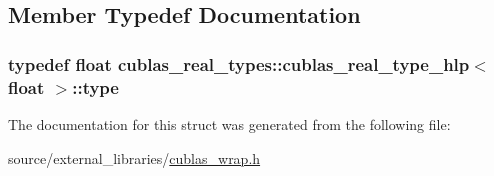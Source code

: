 \subsection{Member Typedef Documentation}
\hypertarget{structcublas__real__types_1_1cublas__real__type__hlp_3_01float_01_4_a533275b329463dc04ad57764131bda3e}{
\subsubsection[{type}]{\setlength{\rightskip}{0pt plus 5cm}typedef float {\bf cublas\-\_\-real\-\_\-types\-::cublas\-\_\-real\-\_\-type\-\_\-hlp}$<$ float $>$\-::{\bf type}}}\label{structcublas__real__types_1_1cublas__real__type__hlp_3_01float_01_4_a533275b329463dc04ad57764131bda3e}


The documentation for this struct was generated from the following file\-:\begin{DoxyCompactItemize}
\item 
source/external\-\_\-libraries/\hyperlink{cublas__wrap_8h}{cublas\-\_\-wrap.\-h}\end{DoxyCompactItemize}
